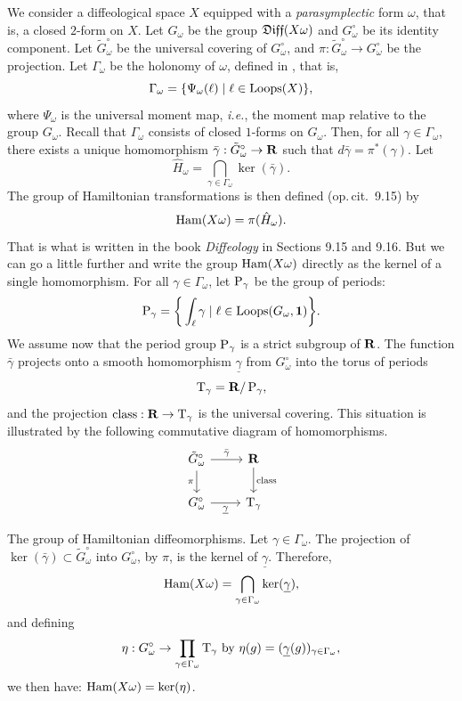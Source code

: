 We consider a diffeological space $X$ equipped with a \emph{parasymplectic} form $\omega$,
that is,
a closed $2$-form on $X$.
Let $G_\omega$ be the group $\mathfrak{Diff}(X\omega)$ and $G_\omega^\circ$ be its identity component.
Let $\tilde G_\omega^\circ$ be the universal covering of $G_\omega^\circ$,
and $\pi : \tilde G_\omega^\circ \to G_\omega^\circ$ be the projection.
Let $\Gamma_\omega$ be the holonomy of $\omega$,
defined in \cite[\textsection\,9.7]{PIZ13},
that is,
$$
  \Gamma_\omega = \{ \Psi_\omega(\ell) \mid \ell \in \operatorname{Loops}(X) \},
$$
where $\Psi_\omega$ is the universal moment map,
\emph{i.e.}, the moment map relative to the group $G_\omega$.
Recall that $\Gamma_\omega$ consists of closed $1$-forms on $G_\omega$.
Then,
for all $\gamma \in \Gamma_\omega$,
there exists a unique homomorphism $\bar\gamma : \tilde G_\omega^\circ \to \mathbf{R}$ such that $d\bar\gamma = \pi^*(\gamma)$.
Let
$$
  \hat H_\omega = \bigcap_{\gamma \in \Gamma_\omega} \ker(\bar\gamma).
$$
The group of Hamiltonian transformations is then defined (op.\,cit. \textsection\,9.15) by
$$
  \operatorname{Ham}(X\omega) = \pi(\hat H_\omega).
$$
That is what is written in the book \textit{Diffeology} in Sections 9.15 and 9.16.
But we can go a little further and write the group $\operatorname{Ham}(X\omega)$ directly as the kernel of a single homomorphism.
For all $\gamma \in \Gamma_\omega$,
let $\operatorname{P}_\gamma$ be the group of periods:
$$
  \operatorname{P}_\gamma = \bigg\{ \int_\ell \gamma \mid \ell \in \operatorname{Loops}(G_\omega,{\mathbf{1}}) \bigg\}.
$$
We assume now that the period group $\operatorname{P}_\gamma$ is a strict subgroup of $\mathbf{R}$.
The function $\bar\gamma$ projects onto a smooth homomorphism $\underline\gamma$ from $G_\omega^\circ$ into the torus of periods
$$
  \mathrm{T}_\gamma = \mathbf{R}/\operatorname{P}_\gamma,
$$
and the projection $\operatorname{class} : \mathbf{R} \to \mathrm{T}_\gamma$ is the universal covering.
This situation is illustrated by the following commutative diagram of homomorphisms.
\[
\begin{tikzcd}
  \tilde G_\omega^\circ  \arrow{r}{\bar\gamma} \arrow{d}[swap]{\pi}  & \RR  \arrow{d}{\Class} \\
  G_\omega^\circ         \arrow{r}[swap]{\underline\gamma}                & \Torus_\gamma
\end{tikzcd}
\]

\begin{Article}{The group of Hamiltonian diffeomorphisms.}{}
  Let $\gamma \in \Gamma_\omega$.
  The projection of $\ker(\bar\gamma) \subset \tilde G_\omega^\circ$ into $G_\omega^\circ$,
  by $\pi$,
  is the kernel of $\underline\gamma$.
  Therefore,
  $$
    \operatorname{Ham}(X\omega) = \bigcap_{\gamma \in \Gamma_\omega} \mathrm{ker}(\underline\gamma),
    $$
  and defining
  $$
    \eta : G_\omega^\circ \to \prod_{\gamma\in\Gamma_\omega} \mathrm{T}_\gamma
    \ \text{by}\ 
    \eta(g) = (\underline\gamma(g))_{\gamma\in\Gamma_\omega},
  $$
  we then have: $\operatorname{Ham}(X\omega) = \mathrm{ker}(\eta)$.
\end{Article}


